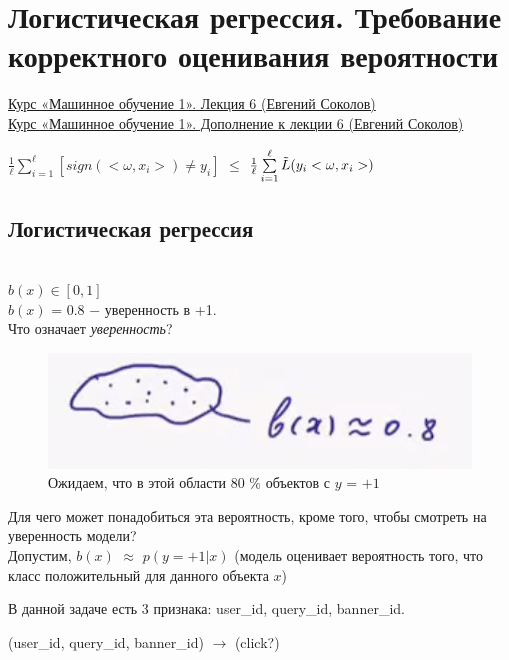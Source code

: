 \newpage
\section{Логистическая регрессия. Требование корректного оценивания вероятности}
    \href{https://www.youtube.com/watch?v=sEqGtjnJE2o&list=PLEqoHzpnmTfChItexxg2ZfxCsm-8QPsdS&index=7}{Курс «Машинное обучение 1». Лекция 6 (Евгений Соколов)}\\
    
    \href{https://www.youtube.com/watch?v=lP1l8YPjSQY}{Курс «Машинное обучение 1». Дополнение к лекции 6 (Евгений Соколов)}


    \begin{center}
        \Large{$\frac{1}{\ell}\sum\limits_{i = 1}^\ell[sign(<\omega, x_i>) \neq y_i]$ $\leq$ $\frac{1}{\ell}\sum\limits_{i = 1}^\ell\Tilde{L}(y_i<\omega, x_i  >)$}
    \end{center}

    \subsection{Логистическая регрессия}

        \\

        $b(x) \in [0, 1]$\\
        
        $b(x)$ = $0.8$ $-$ уверенность в +1.\\

        Что означает \textit{уверенность}?
        \begin{figure}[H]
            \centering
            \includegraphics[width=0.35 \textwidth]{images/6lecture/accuracy_explonation.png}
            \caption{Ожидаем, что в этой области 80 \% объектов с $y$ = $+1$}
        \end{figure}
        Для чего может понадобиться эта вероятность, кроме того, чтобы смотреть на уверенность модели?\\

        Допустим, $b(x)$ $\approx$ $p(y = +1 | x)$ (модель оценивает вероятность того, что класс положительный для данного объекта $x$)
        \begin{center}
        \end{center}
        В данной задаче есть 3 признака: user\_id, query\_id, banner\_id.\\
        \begin{center}
            (user\_id, query\_id, banner\_id) $\longrightarrow$ (click?)
        \end{center}

